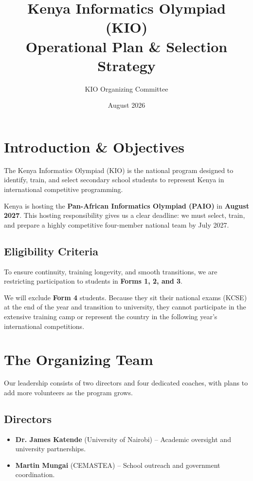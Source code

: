 \documentclass[11pt]{article}
\title{\textbf{Kenya Informatics Olympiad (KIO) \\ Operational Plan \& Selection Strategy}}
\author{KIO Organizing Committee}
\date{August 2026}
\begin{document}
\maketitle

\section{Introduction \& Objectives}
The Kenya Informatics Olympiad (KIO) is the national program designed to identify, train, and select secondary school students to represent Kenya in international competitive programming. 

Kenya is hosting the \textbf{Pan-African Informatics Olympiad (PAIO)} in \textbf{August 2027}. This hosting responsibility gives us a clear deadline: we must select, train, and prepare a highly competitive four-member national team by July 2027.

\subsection{Eligibility Criteria}
To ensure continuity, training longevity, and smooth transitions, we are restricting participation to students in \textbf{Forms 1, 2, and 3}.

We will exclude \textbf{Form 4} students. Because they sit their national exams (KCSE) at the end of the year and transition to university, they cannot participate in the extensive training camp or represent the country in the following year's international competitions.

\section{The Organizing Team}
Our leadership consists of two directors and four dedicated coaches, with plans to add more volunteers as the program grows.

\subsection{Directors}
\begin{itemize}
    \item \textbf{Dr. James Katende} (University of Nairobi) -- Academic oversight and university partnerships.
    \item \textbf{Martin Mungai} (CEMASTEA) -- School outreach and government coordination.
\end{itemize}
\end{document}
